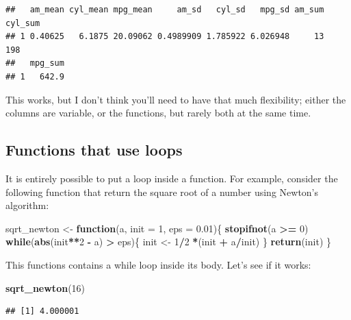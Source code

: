 \documentclass[]{gitbook}
\newenvironment{Shaded}{\begin{snugshade}}{\end{snugshade}}
\newcommand{\ControlFlowTok}[1]{\textcolor[rgb]{0.13,0.29,0.53}{\textbf{#1}}}
\newcommand{\DataTypeTok}[1]{\textcolor[rgb]{0.13,0.29,0.53}{#1}}
\newcommand{\DecValTok}[1]{\textcolor[rgb]{0.00,0.00,0.81}{#1}}
\newcommand{\FloatTok}[1]{\textcolor[rgb]{0.00,0.00,0.81}{#1}}
\newcommand{\KeywordTok}[1]{\textcolor[rgb]{0.13,0.29,0.53}{\textbf{#1}}}
\newcommand{\NormalTok}[1]{#1}
\newcommand{\OperatorTok}[1]{\textcolor[rgb]{0.81,0.36,0.00}{\textbf{#1}}}
\newcommand{\StringTok}[1]{\textcolor[rgb]{0.31,0.60,0.02}{#1}}
\begin{document}
\begin{verbatim}
##   am_mean cyl_mean mpg_mean     am_sd   cyl_sd   mpg_sd am_sum cyl_sum
## 1 0.40625   6.1875 20.09062 0.4989909 1.785922 6.026948     13     198
##   mpg_sum
## 1   642.9
\end{verbatim}

This works, but I don't think you'll need to have that much flexibility; either the columns
are variable, or the functions, but rarely both at the same time.

\hypertarget{functions-that-use-loops}{%
\subsection{Functions that use loops}\label{functions-that-use-loops}}

It is entirely possible to put a loop inside a function. For example, consider the following
function that return the square root of a number using Newton's algorithm:

\begin{Shaded}
\begin{Highlighting}[]
\NormalTok{sqrt_newton <-}\StringTok{ }\ControlFlowTok{function}\NormalTok{(a, }\DataTypeTok{init =} \DecValTok{1}\NormalTok{, }\DataTypeTok{eps =} \FloatTok{0.01}\NormalTok{)\{}
    \KeywordTok{stopifnot}\NormalTok{(a }\OperatorTok{>=}\StringTok{ }\DecValTok{0}\NormalTok{)}
    \ControlFlowTok{while}\NormalTok{(}\KeywordTok{abs}\NormalTok{(init}\OperatorTok{**}\DecValTok{2} \OperatorTok{-}\StringTok{ }\NormalTok{a) }\OperatorTok{>}\StringTok{ }\NormalTok{eps)\{}
\NormalTok{        init <-}\StringTok{ }\DecValTok{1}\OperatorTok{/}\DecValTok{2} \OperatorTok{*}\NormalTok{(init }\OperatorTok{+}\StringTok{ }\NormalTok{a}\OperatorTok{/}\NormalTok{init)}
\NormalTok{    \}}
    \KeywordTok{return}\NormalTok{(init)}
\NormalTok{\}}
\end{Highlighting}
\end{Shaded}

This functions contains a while loop inside its body. Let's see if it works:

\begin{Shaded}
\begin{Highlighting}[]
\KeywordTok{sqrt_newton}\NormalTok{(}\DecValTok{16}\NormalTok{)}
\end{Highlighting}
\end{Shaded}

\begin{verbatim}
## [1] 4.000001
\end{verbatim}
\end{document}

